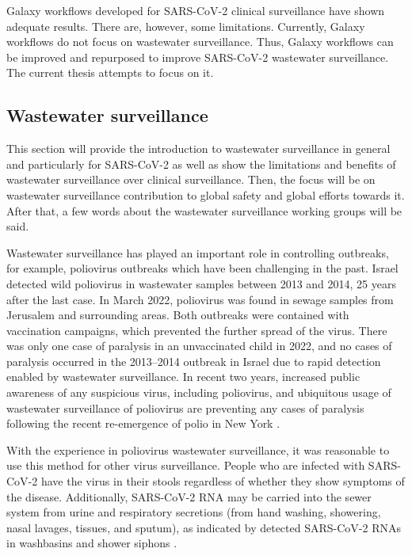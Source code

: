         Galaxy workflows developed for SARS-CoV-2 clinical surveillance have shown adequate results. There are, however, some limitations. Currently, Galaxy workflows do not focus on wastewater surveillance. Thus, Galaxy workflows can be improved and repurposed to improve SARS-CoV-2 wastewater surveillance. The current thesis attempts to focus on it.

        \subsection{Wastewater surveillance}
        
        This section will provide the introduction to wastewater surveillance in general and particularly for SARS-CoV-2 as well as show the limitations and benefits of wastewater surveillance over clinical surveillance. Then, the focus will be on wastewater surveillance contribution to global safety and global efforts towards it. After that, a few words about the wastewater surveillance working groups will be said. 
        
        Wastewater surveillance has played an important role in controlling outbreaks, for example,  poliovirus outbreaks which have been challenging in the past. Israel detected wild poliovirus in wastewater samples between 2013 and 2014, 25 years after the last case. In March 2022, poliovirus was found in sewage samples from Jerusalem and surrounding areas. Both outbreaks were contained with vaccination campaigns, which prevented the further spread of the virus. There was only one case of paralysis in an unvaccinated child in 2022, and no cases of paralysis occurred in the 2013–2014 outbreak in Israel due to rapid detection enabled by wastewater surveillance. In recent two years, increased public awareness of any suspicious virus, including poliovirus, and ubiquitous usage of wastewater surveillance of poliovirus are preventing any cases of paralysis following the recent re-emergence of polio in New York \cite{russo2022}.  
        
        With the experience in poliovirus wastewater surveillance, it was reasonable to use this method for other virus surveillance. People who are infected with SARS-CoV-2 have the virus in their stools regardless of whether they show symptoms of the disease. Additionally, SARS-CoV-2 RNA may be carried into the sewer system from urine  \cite{chan2021} and respiratory secretions (from hand washing, showering, nasal lavages, tissues, and sputum), as indicated by detected SARS-CoV-2 RNAs in washbasins and shower siphons \cite{dohla2022}.  
        
